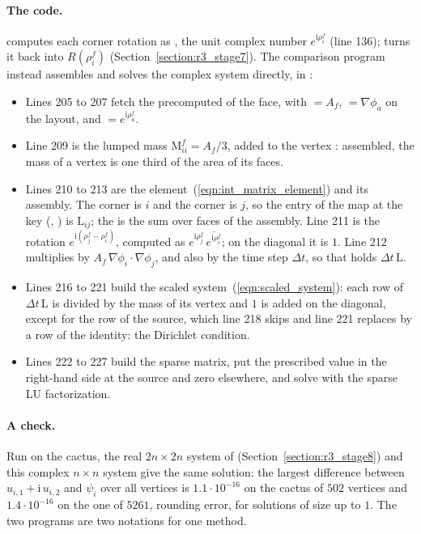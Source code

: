\paragraph{The code.}  computes each corner rotation as , the unit complex number $e^{\mathrm i\rho_i^f}$ (line 136);  turns it back into $R(\rho_i^f)$ (Section~\ref{section:r3_stage7}). The comparison program  instead assembles and solves the complex system directly, in :

\begin{itemize}
\item Lines 205 to 207 fetch the precomputed  of the face, with  $= A_f$,  $= \nabla\phi_a$ on the layout, and  $= e^{\mathrm i\rho_a^f}$.
\item Line 209 is the lumped mass $\mathrm M^f_{ii} = A_f/3$, added to the vertex : assembled, the mass of a vertex is one third of the area of its faces.
\item Lines 210 to 213 are the element~(\ref{eqn:int_matrix_element}) and its assembly. The corner  is $i$ and the corner  is $j$, so the entry of the map  at the key (, ) is $\mathrm L_{ij}$; the \code{+=} is the sum over faces of the assembly. Line 211 is the rotation $e^{\mathrm i(\rho_j^f - \rho_i^f)}$, computed as $e^{\mathrm i\rho_j^f}\,\overline{e^{\mathrm i\rho_i^f}}$; on the diagonal it is $1$. Line 212 multiplies by $A_f\, \nabla\phi_i\cdot\nabla\phi_j$, and also by the time step $\Delta t$, so that  holds $\Delta t\, \mathrm L$.
\item Lines 216 to 221 build the scaled system~(\ref{eqn:scaled_system}): each row of $\Delta t\, \mathrm L$ is divided by the mass of its vertex and $1$ is added on the diagonal, except for the row of the source, which line 218 skips and line 221 replaces by a row of the identity: the Dirichlet condition.
\item Lines 222 to 227 build the sparse matrix, put the prescribed value in the right-hand side at the source and zero elsewhere, and solve with the sparse LU factorization.
\end{itemize}

\paragraph{A check.} Run on the cactus, the real $2n\times 2n$ system of  (Section~\ref{section:r3_stage8}) and this complex $n\times n$ system give the same solution: the largest difference between $u_{i,1} + \mathrm i\, u_{i,2}$ and $\psi_i$ over all vertices is $1.1\cdot 10^{-16}$ on the cactus of $502$ vertices and $1.4\cdot 10^{-16}$ on the one of $5261$, rounding error, for solutions of size up to $1$. The two programs are two notations for one method.

